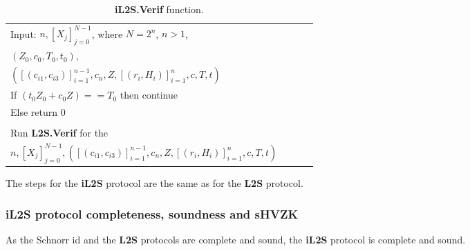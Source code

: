 \documentclass{mathcryptology} %
\theoremstyle{title}
\theoremstyle{titleof}
\begin{document}
    \begin{table}[!htb]\centering
        \caption{\textbf{iL2S.Verif} function.}\label{Tab:8}
        \begin{tabular}{|>{\raggedright\arraybackslash}p{0.9\linewidth}|}
            \hline
            Input: $n, {\left[X_{j}\right]}_{j=0}^{N-1}$, where $N=2^{n}$, $n>1$,\\
            \hspace{24pt} $\left({Z}_{0},c_{0},T_{0},t_{0}\right)$,\\
            \hspace{24pt} $\left({\left[\left(c_{i1}, c_{i3}\right)\right]}_{i=1}^{n-1},
            c_{n}, Z, {\left[\left(r_{i}, H_{i}\right)\right]}_{i=1}^n,c, T, t\right)$\\
            \hline
            If $\left(t_{0} Z_{0} + c_{0}Z \right)==T_{0}$ then continue\\
            Else return $0$\\
            \\
            Run \textbf{L2S.Verif} for the\\
            $n,{\left[X_{j}\right]}_{j=0}^{N-1},
            \left(
                {\left[\left(c_{i1}, c_{i3}\right)\right]}_{i=1}^{n-1},
                c_{n}, Z,
                {\left[\left(r_{i}, H_{i}\right)\right]}_{i=1}^n, c, T, t\right)$\\
            \hline
        \end{tabular}
    \end{table}

    The steps for the \textbf{iL2S} protocol are the same as for the \textbf{L2S} protocol.

\subsubsection{iL2S protocol completeness, soundness and sHVZK}\label{Sec:7.1.1.}
    As the Schnorr id and the \textbf{L2S} protocols are complete and sound, the \textbf{iL2S} protocol is complete and sound.
    
\end{document}
